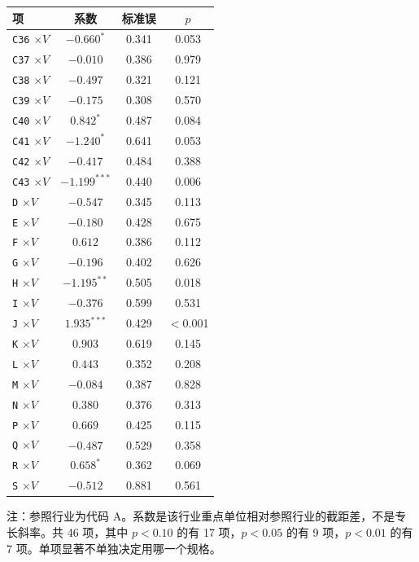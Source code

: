 \begin{center}
\begin{threeparttable}
\caption{完全交互的行业虚拟变量 $\times$ 重点排污单位（续）}
\footnotesize
\begin{tabular}{lccc}
\toprule
项 & 系数 & 标准误 & \(p\) \\
\midrule
\texttt{C36} $\times V$ & $-0.660^{*}$ & 0.341 & 0.053 \\
\texttt{C37} $\times V$ & $-0.010$ & 0.386 & 0.979 \\
\texttt{C38} $\times V$ & $-0.497$ & 0.321 & 0.121 \\
\texttt{C39} $\times V$ & $-0.175$ & 0.308 & 0.570 \\
\texttt{C40} $\times V$ & $0.842^{*}$ & 0.487 & 0.084 \\
\texttt{C41} $\times V$ & $-1.240^{*}$ & 0.641 & 0.053 \\
\texttt{C42} $\times V$ & $-0.417$ & 0.484 & 0.388 \\
\texttt{C43} $\times V$ & $-1.199^{***}$ & 0.440 & 0.006 \\
\texttt{D} $\times V$ & $-0.547$ & 0.345 & 0.113 \\
\texttt{E} $\times V$ & $-0.180$ & 0.428 & 0.675 \\
\texttt{F} $\times V$ & $0.612$ & 0.386 & 0.112 \\
\texttt{G} $\times V$ & $-0.196$ & 0.402 & 0.626 \\
\texttt{H} $\times V$ & $-1.195^{**}$ & 0.505 & 0.018 \\
\texttt{I} $\times V$ & $-0.376$ & 0.599 & 0.531 \\
\texttt{J} $\times V$ & $1.935^{***}$ & 0.429 & $<$0.001 \\
\texttt{K} $\times V$ & $0.903$ & 0.619 & 0.145 \\
\texttt{L} $\times V$ & $0.443$ & 0.352 & 0.208 \\
\texttt{M} $\times V$ & $-0.084$ & 0.387 & 0.828 \\
\texttt{N} $\times V$ & $0.380$ & 0.376 & 0.313 \\
\texttt{P} $\times V$ & $0.669$ & 0.425 & 0.115 \\
\texttt{Q} $\times V$ & $-0.487$ & 0.529 & 0.358 \\
\texttt{R} $\times V$ & $0.658^{*}$ & 0.362 & 0.069 \\
\texttt{S} $\times V$ & $-0.512$ & 0.881 & 0.561 \\
\bottomrule
\end{tabular}
\begin{tablenotes}\footnotesize
\item 注：参照行业为代码 A。系数是该行业重点单位相对参照行业的截距差，不是专长斜率。共 46 项，其中 $p<0.10$ 的有 17 项，$p<0.05$ 的有 9 项，$p<0.01$ 的有 7 项。单项显著不单独决定用哪一个规格。
\end{tablenotes}
\end{threeparttable}
\end{center}

